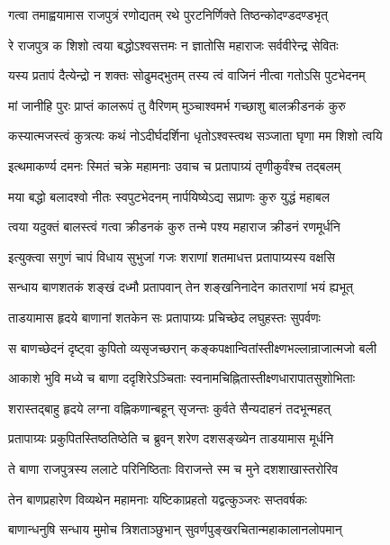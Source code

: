 \twolineshloka
{गत्वा तमाह्वयामास राजपुत्रं रणोद्यतम्}
{रथे पुरटनिर्णिक्ते तिष्ठन्कोदण्डदण्डभृत्}%

\twolineshloka
{रे राजपुत्र क शिशो त्वया बद्धोऽश्वसत्तमः}
{न ज्ञातोसि महाराजः सर्ववीरेन्द्र सेवितः}%

\twolineshloka
{यस्य प्रतापं दैत्येन्द्रो न शक्तः सोढुमद्भुतम्}
{तस्य त्वं वाजिनं नीत्वा गतोऽसि पुटभेदनम्}%

\twolineshloka
{मां जानीहि पुरः प्राप्तं कालरूपं तु वैरिणम्}
{मुञ्चाश्वमर्भ गच्छाशु बालक्रीडनकं कुरु}%

\twolineshloka
{कस्यात्मजस्त्वं कुत्रत्यः कथं नोऽदीर्घदर्शिना}
{धृतोऽश्वस्त्वथ सञ्जाता घृणा मम शिशो त्वयि}%

\twolineshloka
{इत्थमाकर्ण्य दमनः स्मितं चक्रे महामनाः}
{उवाच च प्रतापाग्र्यं तृणीकुर्वंश्च तद्बलम्}%


\twolineshloka
{मया बद्धो बलादश्वो नीतः स्वपुटभेदनम्}
{नार्पयिष्येऽद्य सप्राणः कुरु युद्धं महाबल}%

\twolineshloka
{त्वया यदुक्तं बालस्त्वं गत्वा क्रीडनकं कुरु}
{तन्मे पश्य महाराज क्रीडनं रणमूर्धनि}%


\twolineshloka
{इत्युक्त्वा सगुणं चापं विधाय सुभुजां गजः}
{शराणां शतमाधत्त प्रतापाग्र्यस्य वक्षसि}%

\twolineshloka
{सन्धाय बाणशतकं शङ्खं दध्मौ प्रतापवान्}
{तेन शङ्खनिनादेन कातराणां भयं ह्यभूत्}%

\twolineshloka
{ताडयामास हृदये बाणानां शतकेन सः}
{प्रतापाग्र्यः प्रचिच्छेद लघुहस्तः सुपर्वणः}%

\twolineshloka
{स बाणच्छेदनं दृष्ट्वा कुपितो व्यसृजच्छरान्}
{कङ्कपक्षान्वितांस्तीक्ष्णभल्लान्राजात्मजो बली}%

\twolineshloka
{आकाशे भुवि मध्ये च बाणा ददृशिरेऽञ्चिताः}
{स्वनामचिह्नितास्तीक्ष्णधारापातसुशोभिताः}%

\twolineshloka
{शरास्तद्बाहु हृदये लग्ना वह्निकणान्बहून्}
{सृजन्तः कुर्वते सैन्यदाहनं तदभून्महत्}%

\twolineshloka
{प्रतापाग्र्यः प्रकुपितस्तिष्ठतिष्ठेति च ब्रुवन्}
{शरेण दशसङ्ख्येन ताडयामास मूर्धनि}%

\twolineshloka
{ते बाणा राजपुत्रस्य ललाटे परिनिष्ठिताः}
{विराजन्ते स्म च मुने दशशाखास्तरोरिव}%

\twolineshloka
{तेन बाणप्रहारेण विव्यथेन महामनाः}
{यष्टिकाप्रहतो यद्वत्कुञ्जरः सप्तवर्षकः}%

\twolineshloka
{बाणान्धनुषि सन्धाय मुमोच त्रिशताञ्छुभान्}
{सुवर्णपुङ्खरचितान्महाकालानलोपमान्}%

